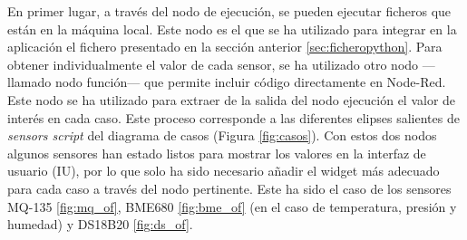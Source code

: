 En primer lugar, a través del nodo de ejecución, se pueden ejecutar ficheros que están en la máquina local. Este nodo es el que se ha utilizado para integrar en la aplicación el fichero presentado en la sección anterior \ref{sec:ficheropython}. Para obtener individualmente el valor de cada sensor, se ha utilizado otro nodo ---llamado nodo función--- que permite incluir código directamente en Node-Red. Este nodo se ha utilizado para extraer de la salida del nodo ejecución el valor de interés en cada caso. Este proceso corresponde a las diferentes elipses salientes de \textit{sensors script} del diagrama de casos (Figura \ref{fig:casos}). Con estos dos nodos algunos sensores han estado listos para mostrar los valores en la interfaz de usuario (IU), por lo que solo ha sido necesario añadir el widget más adecuado para cada caso a través del nodo pertinente. Este ha sido el caso de los sensores MQ-135 \ref{fig:mq_of}, BME680 \ref{fig:bme_of} (en el caso de temperatura, presión y humedad) y DS18B20 \ref{fig:ds_of}.\\

